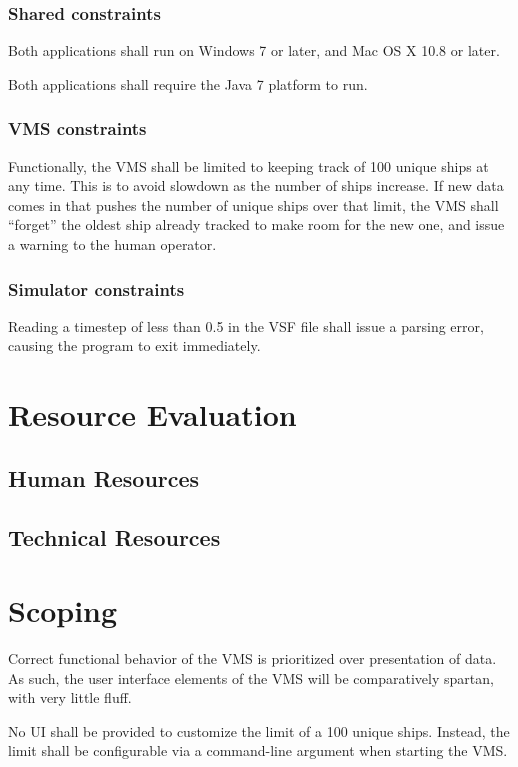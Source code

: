 \documentclass{article}
\begin{document}
\subsubsection{Shared constraints}
Both applications shall run on Windows 7 or later, and Mac OS X 10.8 or later.

Both applications shall require the Java 7 platform to run.

\subsubsection{VMS constraints}
Functionally, the VMS shall be limited to keeping track of 100 unique ships at any time. This is to avoid slowdown as the number of ships increase. If new data comes in that pushes the number of unique ships over that limit, the VMS shall ``forget'' the oldest ship already tracked to make room for the new one, and issue a warning to the human operator.

\subsubsection{Simulator constraints}
Reading a timestep of less than 0.5 in the VSF file shall issue a parsing error, causing the program to exit immediately.

\section{Resource Evaluation}

\subsection{Human Resources}

\subsection{Technical Resources}

\section{Scoping}
Correct functional behavior of the VMS is prioritized over presentation of data. As such, the user interface elements of the VMS will be comparatively spartan, with very little fluff. 

No UI shall be provided to customize the limit of a 100 unique ships. Instead, the limit shall be configurable via a command-line argument when starting the VMS.
\end{document}

